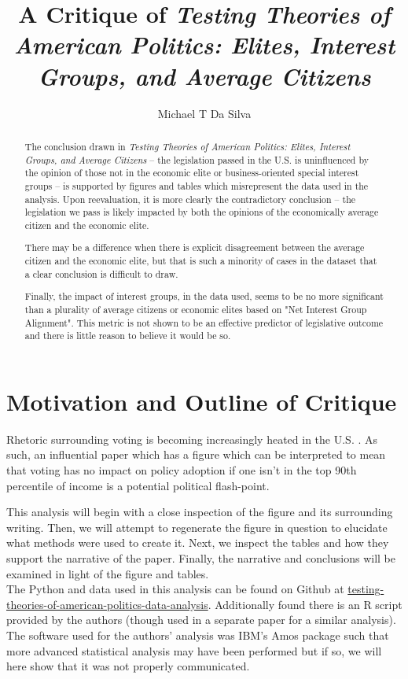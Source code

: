\documentclass[]{article}
\title{A Critique of \textit{Testing Theories of American Politics: Elites, Interest Groups, and Average Citizens} \cite{gilens}}
\author{Michael T Da Silva}
\begin{document}
\maketitle

\begin{abstract}
	The conclusion drawn in \textit{Testing Theories of American Politics: Elites, Interest Groups, and Average Citizens} -- the legislation passed in the U.S. is uninfluenced by the opinion of those not in the economic elite or business-oriented special interest groups -- is supported by figures and tables which misrepresent the data used in the analysis. Upon reevaluation, it is more clearly the contradictory conclusion -- the legislation we pass is likely impacted by both the opinions of the economically average citizen and the economic elite. 
	
	There may be a difference when there is explicit disagreement between the average citizen and the economic elite, but that is such a minority of cases in the dataset that a clear conclusion is difficult to draw.
	
	Finally, the impact of interest groups, in the data used, seems to be no more significant than a plurality of average citizens or economic elites based on "Net Interest Group Alignment". This metric is not shown to be an effective predictor of legislative outcome and there is little reason to believe it would be so.

\end{abstract}

\section{Motivation and Outline of Critique}
Rhetoric surrounding voting is becoming increasingly heated in the U.S. \cite{voting_rights}. 
As such, an influential paper which has a figure which can be interpreted to mean that voting has no impact on policy adoption if one isn't in the top 90th percentile of income is a potential political flash-point.

This analysis will begin with a close inspection of the figure and its surrounding writing.
Then, we will attempt to regenerate the figure in question to elucidate what methods were used to create it.
Next, we inspect the tables and how they support the narrative of the paper.
Finally, the narrative and conclusions will be examined in light of the figure and tables.\\

The Python and data used in this analysis can be found on Github at \href{https://github.com/ChemistryMickey/testing-theories-of-american-politics-data-analysis}{testing-theories-of-american-politics-data-analysis}. Additionally found there is an R script provided by the authors (though used in a separate paper for a similar analysis). The software used for the authors' analysis was IBM's Amos package such that more advanced statistical analysis may have been performed but if so, we will here show that it was not properly communicated.
\end{document}
